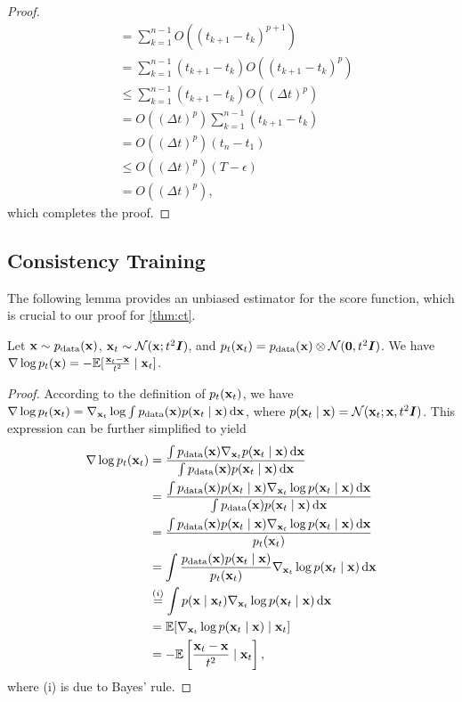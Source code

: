 \begin{appendices}
\begin{proof}
\begin{align*}
        &= \sum_{k=1}^{n-1} O((t_{k+1} - t_k)^{p+1})\\
        &= \sum_{k=1}^{n-1} (t_{k+1} - t_k) O((t_{k+1} - t_k)^{p})\\
        &\leq \sum_{k=1}^{n-1} (t_{k+1} - t_k) O((\Delta t)^{p})\\
        &= O((\Delta t)^p) \sum_{k=1}^{n-1} (t_{k+1} - t_k)\\
        &= O((\Delta t)^p) (t_{n} - t_1)\\
        &\leq O((\Delta t)^p) (T-\epsilon)\\
        &= O((\Delta t)^p),
    \end{align*}
    which completes the proof.
\end{proof}

\subsection{Consistency Training}\label{app:proof_ct}

The following lemma provides an unbiased estimator for the score function, which is crucial to our proof for \cref{thm:ct}.

\begin{lemma}\label{lem:grad_log_p_t}
    Let ${\mathbf{x}} \sim p_\text{data}({\mathbf{x}})$, ${\mathbf{x}}_t \sim \mathcal{N}({\mathbf{x}}; t^2 {\bm{I}})$, and $p_t({\mathbf{x}}_t) = p_\text{data}({\mathbf{x}}) \otimes \mathcal{N}(\bm{0}, t^2{\bm{I}})$. We have $\nabla \log p_t({\mathbf{x}}) = -\mathbb{E}[\frac{{\mathbf{x}}_t - {\mathbf{x}}}{t^2} \mid {\mathbf{x}}_t ]$.
\end{lemma}
\begin{proof}
According to the definition of $p_t({\mathbf{x}}_t)$, we have $\nabla \log p_t({\mathbf{x}}_t) = \nabla_{{\mathbf{x}}_t} \log \int p_\text{data}({\mathbf{x}}) p({\mathbf{x}}_t \mid {\mathbf{x}}) \mathop{}\!\mathrm{d} {\mathbf{x}}$, where $p({\mathbf{x}}_t \mid {\mathbf{x}}) = \mathcal{N}({\mathbf{x}}_t; {\mathbf{x}}, t^2 {\bm{I}})$. This expression can be further simplified to yield
\begin{align*}
    \nabla \log p_t({\mathbf{x}}_t) &= \frac{\int p_\text{data}({\mathbf{x}}) \nabla_{{\mathbf{x}}_t} p({\mathbf{x}}_t \mid {\mathbf{x}}) \mathop{}\!\mathrm{d} {\mathbf{x}}}{\int p_\text{data}({\mathbf{x}}) p({\mathbf{x}}_t \mid {\mathbf{x}}) \mathop{}\!\mathrm{d} {\mathbf{x}}}\\
    &=\frac{\int p_\text{data}({\mathbf{x}}) p({\mathbf{x}}_t \mid {\mathbf{x}}) \nabla_{{\mathbf{x}}_t} \log p({\mathbf{x}}_t \mid {\mathbf{x}}) \mathop{}\!\mathrm{d} {\mathbf{x}}}{\int p_\text{data}({\mathbf{x}}) p({\mathbf{x}}_t \mid {\mathbf{x}}) \mathop{}\!\mathrm{d} {\mathbf{x}}}\\
    &=\frac{\int p_\text{data}({\mathbf{x}}) p({\mathbf{x}}_t \mid {\mathbf{x}}) \nabla_{{\mathbf{x}}_t} \log p({\mathbf{x}}_t \mid {\mathbf{x}}) \mathop{}\!\mathrm{d} {\mathbf{x}}}{p_t({\mathbf{x}}_t)}\\
    &=\int \frac{p_\text{data}({\mathbf{x}}) p({\mathbf{x}}_t \mid {\mathbf{x}})}{p_t({\mathbf{x}}_t)} \nabla_{{\mathbf{x}}_t} \log p({\mathbf{x}}_t \mid {\mathbf{x}}) \mathop{}\!\mathrm{d} {\mathbf{x}}\\
    &\stackrel{(i)}{=}\int p({\mathbf{x}} \mid {\mathbf{x}}_t) \nabla_{{\mathbf{x}}_t} \log p({\mathbf{x}}_t \mid {\mathbf{x}}) \mathop{}\!\mathrm{d} {\mathbf{x}}\\
    &= \mathbb{E}[\nabla_{{\mathbf{x}}_t} \log p({\mathbf{x}}_t \mid {\mathbf{x}}) \mid {\mathbf{x}}_t]\\
    &= -\mathbb{E}\left[\frac{{\mathbf{x}}_t - {\mathbf{x}}}{t^2} \mid {\mathbf{x}}_t\right],
\end{align*}
where (i) is due to Bayes' rule.
\end{proof}


\end{appendices}
